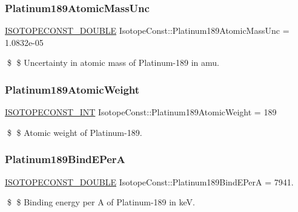 \subsubsection{\texorpdfstring{Platinum189\+Atomic\+Mass\+Unc}{Platinum189AtomicMassUnc}}
{\footnotesize\ttfamily \mbox{\hyperlink{group___isotope_const-_macros_ga8f45a7272ce02c0b4c65c44636ed719a}{I\+S\+O\+T\+O\+P\+E\+C\+O\+N\+S\+T\+\_\+\+D\+O\+U\+B\+LE}} Isotope\+Const\+::\+Platinum189\+Atomic\+Mass\+Unc = 1.\+0832e-\/05}

\$ \$ Uncertainty in atomic mass of Platinum-\/189 in amu. \mbox{\label{group___isotope_const-_platinum-_pt189_gabb70fc0bd92db1b94cb03d705f8cf545}} 
\subsubsection{\texorpdfstring{Platinum189\+Atomic\+Weight}{Platinum189AtomicWeight}}
{\footnotesize\ttfamily \mbox{\hyperlink{group___isotope_const-_macros_ga5f18360b3e99483a35c32d789e62621c}{I\+S\+O\+T\+O\+P\+E\+C\+O\+N\+S\+T\+\_\+\+I\+NT}} Isotope\+Const\+::\+Platinum189\+Atomic\+Weight = 189}

\$ \$ Atomic weight of Platinum-\/189. \mbox{\label{group___isotope_const-_platinum-_pt189_ga79a87f385364a7cf77c7b553c6fd36f4}} 
\subsubsection{\texorpdfstring{Platinum189\+Bind\+E\+PerA}{Platinum189BindEPerA}}
{\footnotesize\ttfamily \mbox{\hyperlink{group___isotope_const-_macros_ga8f45a7272ce02c0b4c65c44636ed719a}{I\+S\+O\+T\+O\+P\+E\+C\+O\+N\+S\+T\+\_\+\+D\+O\+U\+B\+LE}} Isotope\+Const\+::\+Platinum189\+Bind\+E\+PerA = 7941.}

\$ \$ Binding energy per A of Platinum-\/189 in keV. \mbox{\label{group___isotope_const-_platinum-_pt189_ga416d3761e1f6b0ef42a68611435f5132}} 
